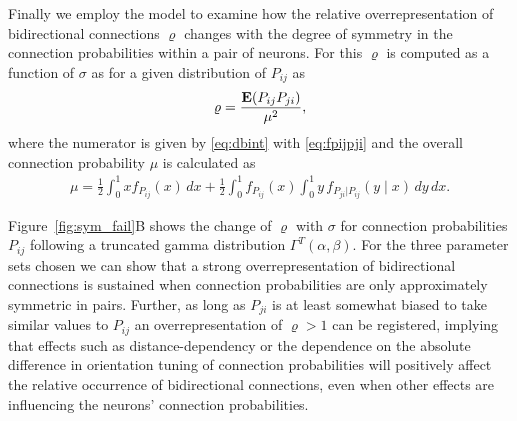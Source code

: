 Finally we employ the model to examine how the relative overrepresentation of bidirectional connections $\varrho$ changes with the degree of symmetry in the connection probabilities within a pair of neurons. For this $\varrho$ is computed as a function of $\sigma$ as for a given distribution of $P_{ij}$ as
%
\begin{align}
  \varrho = \frac{\operatorname{\mathbf{E}}(P_{ij} P_{ji})}{\mu^2}, \label{eq:rho_sigma}
\end{align}
%
where the numerator is given by \eqref{eq:dbint} with %
\eqref{eq:fpijpji} %
%
%
and the overall connection probability $\mu$ is calculated as
%
\begin{align}
 \mu = \frac{1}{2} \int_0^1 x f_{P_{ij}}(x)\,dx + \frac{1}{2} \int_0^1 f_{P_{ij}}(x) \int_0^1 y \,f_{P_{ji}\vert P_{ij}}(y \mid x) \,dy \, dx.
\end{align}
%

Figure~\ref{fig:sym_fail}B shows the change of $\varrho$ with $\sigma$ for connection probabilities $P_{ij}$ following a truncated gamma distribution $\Gamma^T(\alpha, \beta)$. For the three parameter sets chosen we can show that a strong overrepresentation of bidirectional connections is sustained when connection probabilities are only approximately symmetric in pairs. Further, as long as $P_{ji}$ is at least somewhat biased to take similar values to $P_{ij}$ an overrepresentation of $\varrho > 1$ can be registered, implying that effects such as distance-dependency or the dependence on the absolute difference in orientation tuning of connection probabilities will positively affect the relative occurrence of bidirectional connections, even when other effects are influencing the neurons' connection probabilities.


